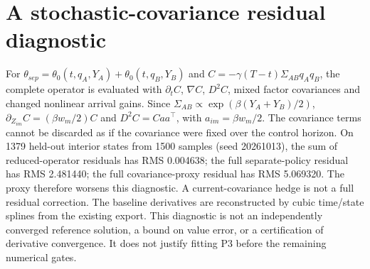 \section{A stochastic-covariance residual diagnostic}
For $\theta_{sep}=\theta_0(t,q_A,Y_A)+\theta_0(t,q_B,Y_B)$ and $C=-\gamma(T-t)\Sigma_{AB}q_Aq_B$, the complete operator is evaluated with $\partial_t C$, $\nabla C$, $D^2 C$, mixed factor covariances and changed nonlinear arrival gains. Since $\Sigma_{AB}\propto\exp(\beta(Y_A+Y_B)/2)$, $\partial_{Z_{im}}C=(\beta w_m/2)C$ and $D^2 C=Caa^\top$, with $a_{im}=\beta w_m/2$. The covariance terms cannot be discarded as if the covariance were fixed over the control horizon.
On 1379 held-out interior states from 1500 samples (seed 20261013), the sum of reduced-operator residuals has RMS 0.004638; the full separate-policy residual has RMS 2.481440; the full covariance-proxy residual has RMS 5.069320. The proxy therefore worsens this diagnostic. A current-covariance hedge is not a full residual correction.
The baseline derivatives are reconstructed by cubic time/state splines from the existing export. This diagnostic is not an independently converged reference solution, a bound on value error, or a certification of derivative convergence. It does not justify fitting P3 before the remaining numerical gates.
